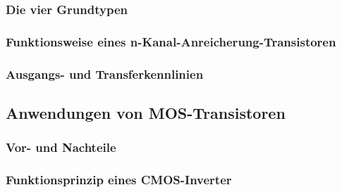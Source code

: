 	\subsubsection{Die vier Grundtypen}
	\subsubsection{Funktionsweise eines n-Kanal-Anreicherung-Transistoren}
	\subsubsection{Ausgangs- und Transferkennlinien}
\subsection{Anwendungen von MOS-Transistoren}
	\subsubsection{Vor- und Nachteile}
	\subsubsection{Funktionsprinzip eines CMOS-Inverter}


